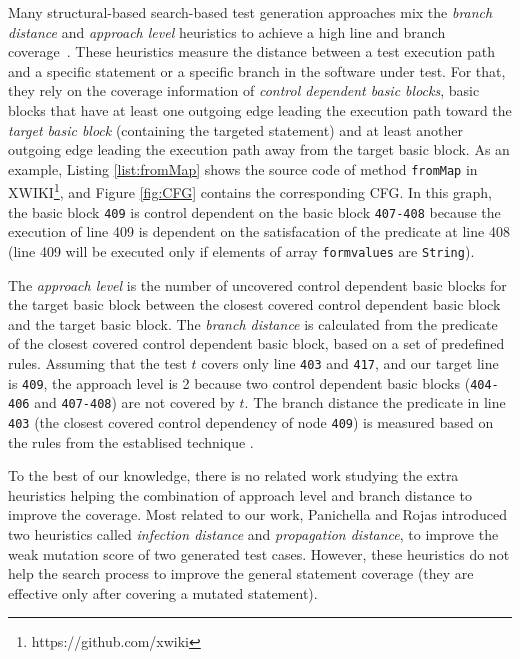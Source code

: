 Many structural-based search-based test generation approaches mix the \textit{branch distance} and \textit{approach level} heuristics to achieve a high line and branch coverage~\cite{McMinn2004}. These heuristics measure the distance between a test execution path and a specific statement or a specific branch in the software under test.
For that, they rely on the coverage information of \emph{control dependent basic blocks}, \ie basic blocks that have at least one outgoing edge leading the execution path toward the \emph{target basic block} (containing the targeted statement) and at least another outgoing edge leading the execution path away from the target basic block.
As an example, Listing \ref{list:fromMap} shows the source code of method \texttt{fromMap} in XWIKI\footnote{https://github.com/xwiki}, and Figure \ref{fig:CFG} contains the corresponding CFG. In this graph, the basic block \texttt{409} is control dependent on the basic block \texttt{407-408} because the execution of line 409 is dependent on the satisfacation of the predicate at line 408 (\ie line 409 will be executed only if elements of array \texttt{formvalues} are \texttt{String}).

The \textit{approach level} is the number of uncovered control dependent basic blocks for the target basic block between the closest covered control dependent basic block and the target basic block. The \textit{branch distance} is calculated from the predicate of the closest covered control dependent basic block, based on a set of predefined rules. Assuming that the test $t$ covers only line \texttt{403} and \texttt{417}, and our target line is \texttt{409}, the approach level is 2 because two control dependent basic blocks (\texttt{404-406} and \texttt{407-408}) are not covered by $t$. The branch distance the predicate in line \texttt{403} (the closest covered control dependency of node \texttt{409}) is measured based on the rules from the establised technique \cite{McMinn2004}.

To the best of our knowledge, there is no related work studying the extra heuristics helping the combination of approach level and branch distance to improve the coverage. Most related to our work, Panichella \etal \cite{Panichella2018} and Rojas \etal \cite{rojas2015combining} introduced two heuristics called \textit{infection distance} and \textit{propagation distance}, to improve the weak mutation score of two generated test cases. However, these heuristics do not help the search process to improve the general statement coverage (\ie they are effective only after covering a mutated statement).

